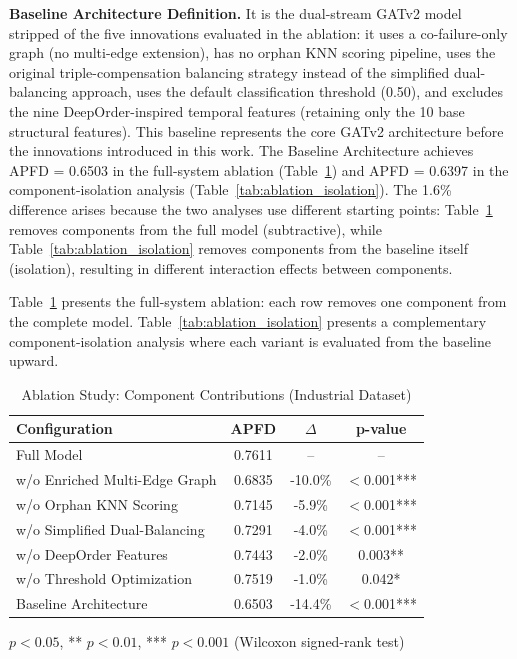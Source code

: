 \textbf{Baseline Architecture Definition.}
It is the dual-stream GATv2 model stripped of
the five innovations evaluated in the ablation: it uses a co-failure-only
graph (no multi-edge extension), has no orphan KNN scoring pipeline, uses the
original triple-compensation balancing strategy instead of the simplified
dual-balancing approach, uses the default classification threshold (0.50),
and excludes the nine DeepOrder-inspired temporal features (retaining only
the 10 base structural features). This baseline represents the core GATv2
architecture before the innovations introduced in this work.
The Baseline Architecture achieves APFD = 0.6503 in the full-system
ablation (Table~\ref{tab:ablation}) and APFD = 0.6397 in the
component-isolation analysis (Table~\ref{tab:ablation_isolation}). The
1.6\% difference arises because the two analyses use different starting
points: Table~\ref{tab:ablation} removes components from the full model
(subtractive), while Table~\ref{tab:ablation_isolation} removes components
from the baseline itself (isolation), resulting in different interaction
effects between components.

Table~\ref{tab:ablation} presents the full-system ablation: each row removes
one component from the complete model. Table~\ref{tab:ablation_isolation}
presents a complementary component-isolation analysis where each variant is
evaluated from the baseline upward.

\begin{table}[!t]
\centering
\caption{Ablation Study: Component Contributions (Industrial Dataset)}
\label{tab:ablation}
\begin{tabular}{lccc}
\toprule
\textbf{Configuration} & \textbf{APFD} & \textbf{$\Delta$} & \textbf{p-value} \\
\midrule
Full Model & 0.7611 & -- & -- \\
\midrule
w/o Enriched Multi-Edge Graph & 0.6835 & -10.0\% & $<$0.001*** \\
w/o Orphan KNN Scoring & 0.7145 & -5.9\% & $<$0.001*** \\
w/o Simplified Dual-Balancing & 0.7291 & -4.0\% & $<$0.001*** \\
w/o DeepOrder Features & 0.7443 & -2.0\% & 0.003** \\
w/o Threshold Optimization & 0.7519 & -1.0\% & 0.042* \\
\midrule
Baseline Architecture & 0.6503 & -14.4\% & $<$0.001*** \\
\bottomrule
\end{tabular}
\begin{tablenotes}
\small
\item * $p < 0.05$, ** $p < 0.01$, *** $p < 0.001$ (Wilcoxon signed-rank test)
\end{tablenotes}
\end{table}

